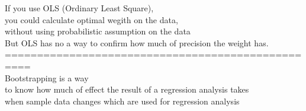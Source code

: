 \documentclass{article}
\begin{document}
If you use OLS (Ordinary Least Square), \\ 
you could calculate optimal wegith on the data, \\ 
without using probabilistic assumption on the data \\ 

But OLS has no a way to confirm how much of precision the weight has. \\ 

==================================================\\
Bootstrapping is a way \\ 
to know how much of effect the result of a regression analysis takes \\ 
when sample data changes which are used for regression analysis \\ 
\end{document}

